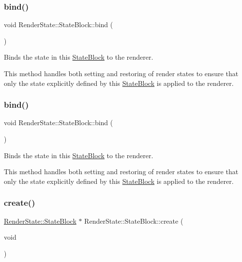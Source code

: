 \subsubsection{\texorpdfstring{bind()}{bind()}\hspace{0.1cm}{\footnotesize\ttfamily [1/2]}}
{\footnotesize\ttfamily void Render\+State\+::\+State\+Block\+::bind (\begin{DoxyParamCaption}{ }\end{DoxyParamCaption})}

Binds the state in this \hyperlink{classRenderState_1_1StateBlock}{State\+Block} to the renderer.

This method handles both setting and restoring of render states to ensure that only the state explicitly defined by this \hyperlink{classRenderState_1_1StateBlock}{State\+Block} is applied to the renderer. \mbox{\label{classRenderState_1_1StateBlock_a045055d7b3f19710d52f2a00900fec50}} 
\subsubsection{\texorpdfstring{bind()}{bind()}\hspace{0.1cm}{\footnotesize\ttfamily [2/2]}}
{\footnotesize\ttfamily void Render\+State\+::\+State\+Block\+::bind (\begin{DoxyParamCaption}{ }\end{DoxyParamCaption})}

Binds the state in this \hyperlink{classRenderState_1_1StateBlock}{State\+Block} to the renderer.

This method handles both setting and restoring of render states to ensure that only the state explicitly defined by this \hyperlink{classRenderState_1_1StateBlock}{State\+Block} is applied to the renderer. \mbox{\label{classRenderState_1_1StateBlock_aa972f8dee9bea10f54006a4196adf632}} 
\subsubsection{\texorpdfstring{create()}{create()}\hspace{0.1cm}{\footnotesize\ttfamily [1/2]}}
{\footnotesize\ttfamily \hyperlink{classRenderState_1_1StateBlock}{Render\+State\+::\+State\+Block} $\ast$ Render\+State\+::\+State\+Block\+::create (\begin{DoxyParamCaption}\item[{void}]{ }\end{DoxyParamCaption})\hspace{0.3cm}{\ttfamily [static]}}

